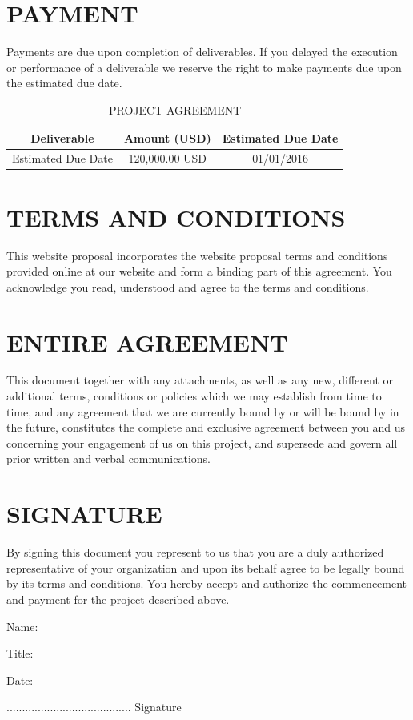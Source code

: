 \documentclass[12pt]{report}
\begin{document}
\section{PAYMENT}
\item Payments are due upon completion of deliverables. If you delayed the execution or performance of a deliverable we reserve the right to make payments due upon the estimated due date.

\begin{table}[ht]
\caption{PROJECT AGREEMENT} %
\centering %
\begin{tabular}{c c c} %
\hline\hline %
Deliverable & Amount (USD) & Estimated Due Date \\ [0.5ex] %
\hline %
Estimated Due Date & 120,000.00 USD & 01/01/2016 \\ [1ex] %
\hline %
\end{tabular}
\label{table:nonlin} %
\end{table}

\section{TERMS AND CONDITIONS}
\item This website proposal incorporates the website proposal terms and conditions provided online at our website and form a binding part of this agreement. You acknowledge you read, understood and agree to the terms and conditions.

\section{ENTIRE AGREEMENT}
\item This document together with any attachments, as well as any new, different or additional terms, conditions or policies which we may establish from time to time, and any agreement that we are currently bound by or will be bound by in the future, constitutes the complete and exclusive agreement between you and us concerning your engagement of us on this project, and supersede and govern all prior written and verbal communications.

\section{SIGNATURE}
\item By signing this document you represent to us that you are a duly authorized representative of your organization and upon its behalf agree to be legally bound by its terms and conditions. You hereby accept and authorize the commencement and payment for the project described above.

Name:

Title:

Date:

........................................
Signature
\end{document}
